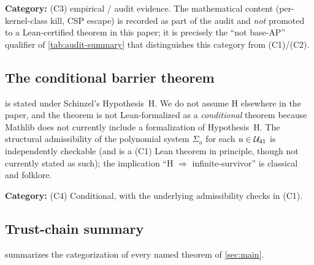 \textbf{Category:} (C3) empirical / audit evidence. The
mathematical content (per-kernel-class kill, CSP escape) is
recorded as part of the audit and \emph{not} promoted to a
Lean-certified theorem in this paper; it is precisely the
``not base-AP'' qualifier of \cref{tab:audit-summary} that
distinguishes this category from (C1)/(C2).

\subsection{The conditional barrier theorem}
\label{sec:lean-conditional}

 is stated under Schinzel's
Hypothesis~H. We do not assume H elsewhere in the paper, and the
theorem is not Lean-formalized as a \emph{conditional} theorem
because Mathlib does not currently include a formalization of
Hypothesis~H. The structural admissibility of the polynomial system
$\Sigma_u$ for each $u \in \mathcal{U}_{41}$ is independently checkable (and
is a (C1) Lean theorem in principle, though not currently stated as
such); the implication ``H $\Rightarrow$ infinite-survivor'' is
classical and folklore.

\textbf{Category:} (C4) Conditional, with the underlying admissibility
checks in (C1).

\subsection{Trust-chain summary}
\label{sec:lean-trust-chain}

 summarizes the categorization of every named
theorem of \cref{sec:main}.


